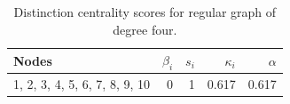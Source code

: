 \begin{table}
\centering
\caption{\label{tab:kr}Distinction centrality scores for regular graph of degree four.}
\centering
\begin{tabular}[t]{lrrrr}
\toprule
Nodes & $\beta_i$ & $s_i$ & $\kappa_i$ & $\alpha$\\
\midrule
1, 2, 3, 4, 5, 6, 7, 8, 9, 10 & 0 & 1 & 0.617 & 0.617\\
\bottomrule
\end{tabular}
\end{table}
